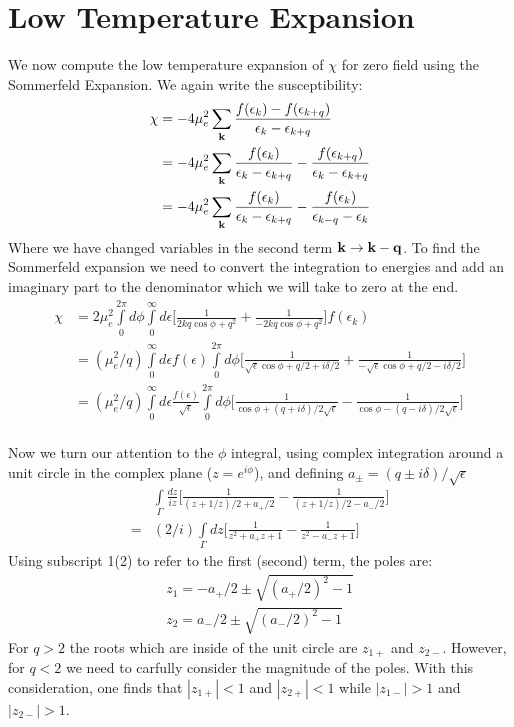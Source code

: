 \documentclass{article}
\begin{document}
 \section{Low Temperature Expansion}
 We now compute the low temperature expansion of $\chi$ for zero field using the Sommerfeld Expansion. We again write the susceptibility:
 \begin{align*}
 \chi&=-4\mu_e^2\sum\limits_{\bf k} \frac{ f(\epsilon_k)-f(\epsilon_{k+q})}{\epsilon_k-\epsilon_{k+q}} \\
 &=-4\mu_e^2\sum\limits_{\bf k} \frac{f(\epsilon_k)}{\epsilon_k-\epsilon_{k+q}} -\frac{f(\epsilon_{k+q})}{\epsilon_k-\epsilon_{k+q}} \\
  &=-4\mu_e^2\sum\limits_{\bf k} \frac{f(\epsilon_k)}{\epsilon_k-\epsilon_{k+q}} -\frac{f(\epsilon_{k})}{\epsilon_{k-q}-\epsilon_{k}} \\
 \end{align*}
  Where we have changed variables in the second term $\bf k \rightarrow k-q$. To find the Sommerfeld expansion we need to convert the integration to energies and add an imaginary part to the denominator which we will take to zero at the end.
  \begin{align*}
  \chi&=2\mu_e^2\int\limits_0^{2\pi}d\phi\int \limits_0^{\infty}d\epsilon\bigg[ \frac{1}{2kq\cos\phi+q^2} +\frac{1}{-2kq\cos\phi+q^2} \bigg]f(\epsilon_{k})\\
   &=(\mu_e^2/q)\int \limits_0^{\infty}d\epsilon f(\epsilon)\int\limits_0^{2\pi}d\phi\bigg[ \frac{1}{\sqrt{\epsilon}\cos\phi+q/2+i\delta/2} +\frac{1}{-\sqrt{\epsilon}\cos\phi+q/2-i\delta/2} \bigg]\\
    &=(\mu_e^2/q)\int \limits_0^{\infty}d\epsilon \frac{f(\epsilon)}{\sqrt{\epsilon}}\int\limits_0^{2\pi}d\phi\bigg[ \frac{1}{\cos\phi+(q+i\delta)/2\sqrt{\epsilon}} -\frac{1}{\cos\phi-(q-i\delta)/2\sqrt{\epsilon}} \bigg]\\
  \end{align*}
  

  Now we turn our attention to the $\phi$ integral, using complex integration around a unit circle in the complex plane ($z=e^{i\phi}$), and defining $a_{\pm}=(q\pm i\delta)/\sqrt{\epsilon}$
  \begin{align*}
  &\int\limits_\Gamma \frac{dz}{iz} \bigg[ \frac{1}{(z+1/z)/2+a_+/2} -\frac{1}{(z+1/z)/2-a_- /2} \bigg] \\
  =&(2/i)\int\limits_\Gamma dz \bigg[ \frac{1}{z^2+a_+z+1} -\frac{1}{z^2-a_-z+1} \bigg] 
  \end{align*}
  Using subscript 1(2) to refer to the first (second) term, the poles are:
  \begin{align*}
  z_1=-a_+/2\pm\sqrt{(a_+/2)^2-1} \\
  z_2=a_-/2\pm\sqrt{(a_-/2)^2-1}
  \end{align*}
  For $q>2$ the roots which are inside of the unit circle are $z_{1+}$ and $z_{2-}$. However, for $q<2$ we need to carfully consider the magnitude of the poles. With this consideration, one finds that  $|z_{1+}|<1$ and $|z_{2+}|<1$ while  $|z_{1-}|>1$ and $|z_{2-}|>1$. \\[1cm]
  
\end{document}
